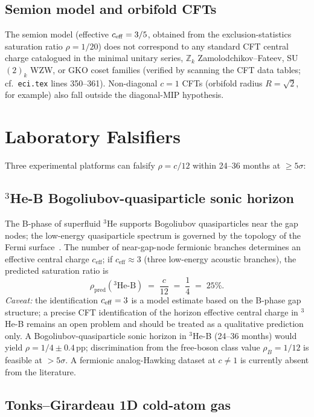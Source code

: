 \documentclass[12pt]{article}
\begin{document}
\subsection{Semion model and orbifold CFTs}

The semion model (effective $c_{\rm eff} = 3/5$, obtained from
the exclusion-statistics saturation ratio $\rho=1/20$) does not
correspond to any standard CFT central charge catalogued in the
minimal unitary series, $\mathbb{Z}_k$ Zamolodchikov--Fateev,
SU$(2)_k$ WZW, or GKO coset families (verified by scanning the
CFT data tables; cf.\ \texttt{eci.tex} lines 350--361).
Non-diagonal $c=1$ CFTs (orbifold radius
$R = \sqrt{2}$, for example) also fall outside the diagonal-MIP
hypothesis.

\section{Laboratory Falsifiers}

Three experimental platforms can falsify $\rho = c/12$ within
24--36 months at $\geq 5\sigma$:

\subsection{${}^3$He-B Bogoliubov-quasiparticle sonic horizon}

The B-phase of superfluid ${}^3$He supports Bogoliubov quasiparticles
near the gap nodes; the low-energy quasiparticle spectrum is governed
by the topology of the Fermi surface~\cite{VolovikBook2003}.
The number of near-gap-node fermionic branches determines an effective
central charge $c_{\mathrm{eff}}$; if $c_{\mathrm{eff}} \approx 3$
(three low-energy acoustic branches), the predicted saturation ratio is
\[
  \rho_{\mathrm{pred}}({}^3\text{He-B}) \;=\; \frac{c}{12} \;=\; \frac{1}{4} \;=\; 25\%.
\]
\textit{Caveat:} the identification $c_{\rm eff}=3$ is a model estimate
based on the B-phase gap structure; a precise CFT identification of the
horizon effective central charge in ${}^3$He-B remains an open problem
and should be treated as a qualitative prediction only.
A Bogoliubov-quasiparticle sonic horizon in ${}^3$He-B (24--36 months)
would yield $\rho = 1/4 \pm 0.4$\,pp; discrimination from the free-boson
class value $\rho_B = 1/12$ is feasible at $> 5\sigma$.  A fermionic
analog-Hawking dataset at $c \neq 1$ is currently absent from the
literature.

\subsection{Tonks--Girardeau 1D cold-atom gas}
\end{document}
